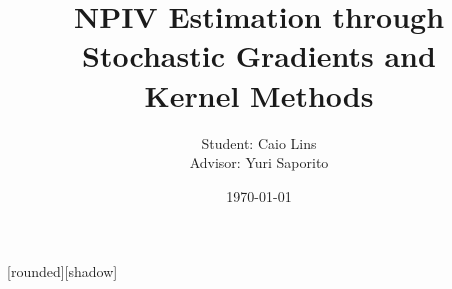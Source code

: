 \usepackage{global-macros}
\usepackage{graphicx}
\graphicspath{{../fig}}
\usepackage{algpseudocode, algorithm}
\usepackage{biblatex}
\usepackage{cancel}

[rounded][shadow]

\vfuzz=30pt




\title{NPIV Estimation through Stochastic Gradients and \\ Kernel Methods}
\author{Student: Caio Lins
        \\ Advisor: Yuri Saporito
}
\date{\today}




\newcommand{\boldf}{\boldsymbol{f}}

\newcommand{\hstar}{h^{ \star }}
\newcommand{\risk}{\mathcal{R}}
\newcommand{\loss}{\ell}
\renewcommand{\hat}{\widehat}
\newcommand{\iid}{\overset{\mathrm{iid}}{\sim}}
\DeclareMathOperator{\diam}{diam}
\newcommand{\data}{\mathcal{D}}
\newcommand{\dataproj}{\mathcal{D}_{ \mathrm{proj} }}
\newcommand{\meanop}{\mathcal{P}}

\DeclareMathOperator{\mse}{MSE}
